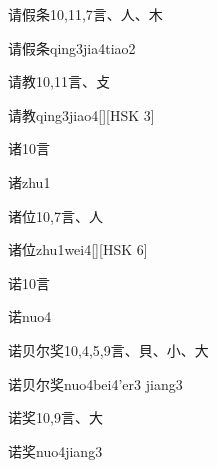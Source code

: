 \begin{Entry}{请假条}{10,11,7}{⾔、⼈、⽊}
  \begin{Phonetics}{请假条}{qing3jia4tiao2}
  \end{Phonetics}
\end{Entry}

\begin{Entry}{请教}{10,11}{⾔、⽁}
  \begin{Phonetics}{请教}{qing3jiao4}[][HSK 3]
  \end{Phonetics}
\end{Entry}

\begin{Entry}{诸}{10}{⾔}
  \begin{Phonetics}{诸}{zhu1}
  \end{Phonetics}
\end{Entry}

\begin{Entry}{诸位}{10,7}{⾔、⼈}
  \begin{Phonetics}{诸位}{zhu1wei4}[][HSK 6]
  \end{Phonetics}
\end{Entry}

\begin{Entry}{诺}{10}{⾔}
  \begin{Phonetics}{诺}{nuo4}
  \end{Phonetics}
\end{Entry}

\begin{Entry}{诺贝尔奖}{10,4,5,9}{⾔、⾙、⼩、⼤}
  \begin{Phonetics}{诺贝尔奖}{nuo4bei4'er3 jiang3}
  \end{Phonetics}
\end{Entry}

\begin{Entry}{诺奖}{10,9}{⾔、⼤}
  \begin{Phonetics}{诺奖}{nuo4jiang3}
  \end{Phonetics}
\end{Entry}

